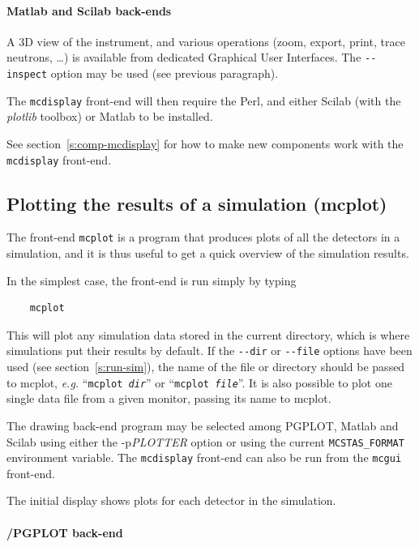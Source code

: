 \paragraph{Matlab and Scilab back-ends}

A 3D view of the instrument, and various operations (zoom, export, print, trace neutrons, \ldots) is available from dedicated Graphical User Interfaces.
The \verb+--inspect+ option may be used (see previous paragraph).

The \verb+mcdisplay+ front-end will then
require the Perl, and either Scilab (with the {\em plotlib} toolbox) or Matlab to be installed.  

See section~\ref{s:comp-mcdisplay} for how to make new components work
with the \verb+mcdisplay+ front-end.

\subsection{Plotting the results of a simulation (mcplot)}
\label{s:mcplot}

The front-end \verb+mcplot+ is a program that produces
plots of all the detectors in a simulation, and it is thus useful to get
a quick overview of the simulation results.

In the simplest case, the front-end is run simply by typing
\begin{verbatim}
    mcplot
\end{verbatim}
This will plot any simulation data stored in the current directory,
which is where simulations put their results by default. If the
\verb+--dir+ or \verb+--file+ options have been used (see
section~\ref{s:run-sim}), the name of the file or directory should be
passed to mcplot, {\em e.g.} ``\texttt{mcplot {\it dir}}'' or ``\texttt{mcplot
  {\it file}}''.
It is also possible to plot one single data file from a given monitor, passing its name to mcplot.

The drawing back-end program may be selected among PGPLOT, Matlab and Scilab using either the -p{\it PLOTTER} option or using the current \verb+MCSTAS_FORMAT+ environment variable. 
The \verb+mcdisplay+ front-end can also be run from the \verb+mcgui+ front-end.

The initial display shows plots for each detector in the simulation.

\paragraph{\MCS /PGPLOT back-end}

